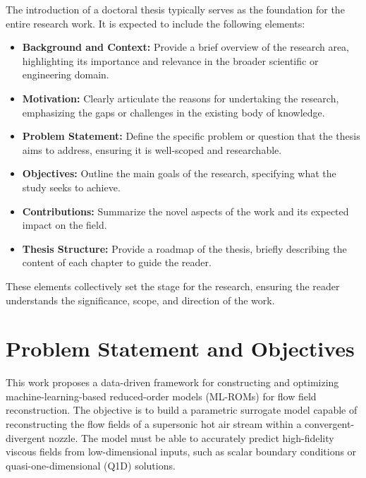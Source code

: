 \documentclass[dscexam, EN]{ufabcFHZh}
\begin{document}
The introduction of a doctoral thesis typically serves as the foundation for the entire research work. It is expected to include the following elements:

\begin{itemize}
    \item \textbf{Background and Context:} Provide a brief overview of the research area, highlighting its importance and relevance in the broader scientific or engineering domain.
    \item \textbf{Motivation:} Clearly articulate the reasons for undertaking the research, emphasizing the gaps or challenges in the existing body of knowledge.
    \item \textbf{Problem Statement:} Define the specific problem or question that the thesis aims to address, ensuring it is well-scoped and researchable.
    \item \textbf{Objectives:} Outline the main goals of the research, specifying what the study seeks to achieve.
    \item \textbf{Contributions:} Summarize the novel aspects of the work and its expected impact on the field.
    \item \textbf{Thesis Structure:} Provide a roadmap of the thesis, briefly describing the content of each chapter to guide the reader.
\end{itemize}

These elements collectively set the stage for the research, ensuring the reader understands the significance, scope, and direction of the work.

\section{Problem Statement and Objectives}

This work proposes a data-driven framework for constructing and optimizing machine-learning-based reduced-order models (ML-ROMs) for flow field reconstruction. The objective is to build a parametric surrogate model capable of reconstructing the flow fields of a supersonic hot air stream within a convergent-divergent nozzle. The model must be able to accurately predict high-fidelity viscous fields from low-dimensional inputs, such as scalar boundary conditions or quasi-one-dimensional (Q1D) solutions.
\end{document}
